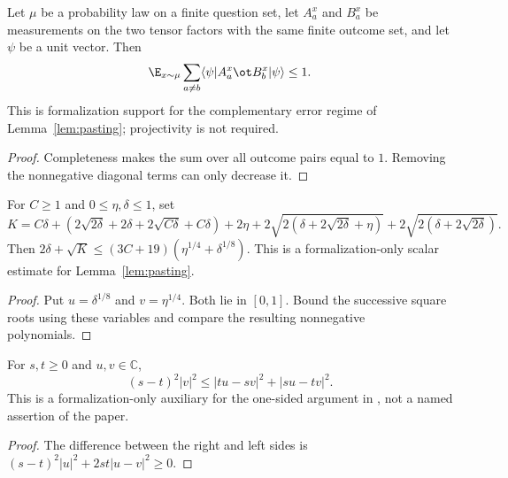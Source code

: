 \begin{lemma}
	\label{lem:pasting-defect-bound}
	\leanok
	Let $\mu$ be a probability law on a finite question set, let $A^x_a$ and
	$B^x_a$ be measurements on the two tensor factors with the same finite
	outcome set, and let $\psi$ be a unit vector. Then
	\[
		\E_{x\sim\mu}\sum_{a\ne b}
		\langle\psi|A^x_a\ot B^x_b|\psi\rangle\leq1.
	\]
	This is formalization support for the complementary error regime of
	Lemma~\ref{lem:pasting}; projectivity is not required.
\end{lemma}
\begin{proof}
	\leanok
	Completeness makes the sum over all outcome pairs equal to $1$.
	Removing the nonnegative diagonal terms can only decrease it.
\end{proof}

\begin{lemma}
	\label{lem:pasting-scalar-error}
	\leanok
	For $C\geq1$ and $0\leq\eta,\delta\leq1$, set
	\[
		K=C\delta+(2\sqrt{2\delta}+2\delta+2\sqrt{C\delta}+C\delta)
		  +2\eta+2\sqrt{2(\delta+2\sqrt{2\delta}+\eta)}
		  +2\sqrt{2(\delta+2\sqrt{2\delta})}.
	\]
	Then $2\delta+\sqrt K\leq(3C+19)(\eta^{1/4}+\delta^{1/8})$.
	This is a formalization-only scalar estimate for Lemma~\ref{lem:pasting}.
\end{lemma}
\begin{proof}
	\leanok
	Put $u=\delta^{1/8}$ and $v=\eta^{1/4}$. Both lie in $[0,1]$.
	Bound the successive square roots using these variables and compare
	the resulting nonnegative polynomials.
\end{proof}

\begin{lemma}
	\label{lem:pasting-schmidt-pair}
	\leanok
	For $s,t\geq0$ and $u,v\in\mathbb C$,
	\[
		(s-t)^2|v|^2 \leq |tu-sv|^2+|su-tv|^2.
	\]
	This is a formalization-only auxiliary for the one-sided argument in
	\cite{gap:qpbt_pasting-product-error}, not a named assertion of the paper.
\end{lemma}
\begin{proof}
	\leanok
	The difference between the right and left sides is
	$(s-t)^2|u|^2+2st|u-v|^2\geq0$.
\end{proof}

